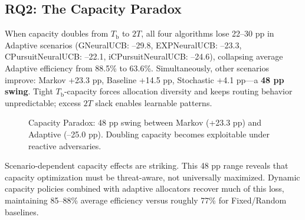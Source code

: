 \documentclass[sigconf,anonymous]{acmart}
\newcommand{\Tb}{T_{\text{b}}}
\newcommand{\TwoT}{2T}
\begin{document}
\subsection{RQ2: The Capacity Paradox}

When capacity doubles from $\Tb$ to $\TwoT$, all four algorithms lose 22--30 pp in Adaptive scenarios (GNeuralUCB: --29.8, EXPNeuralUCB: --23.3, CPursuitNeuralUCB: --22.1, iCPursuitNeuralUCB: --24.6), collapsing average Adaptive efficiency from 88.5\% to 63.6\%. Simultaneously, other scenarios improve: Markov +23.3 pp, Baseline +14.5 pp, Stochastic +4.1 pp—a \textbf{48 pp swing}. Tight $\Tb$-capacity forces allocation diversity and keeps routing behavior unpredictable; excess $\TwoT$ slack enables learnable patterns.

\begin{figure}[tb]
\centering
{}
\caption{Capacity Paradox: 48 pp swing between Markov (+23.3 pp) and Adaptive (--25.0 pp). Doubling capacity becomes exploitable under reactive adversaries.}
\label{fig:paradox}
\end{figure}

Scenario-dependent capacity effects are striking. This 48 pp range reveals that capacity optimization must be threat-aware, not universally maximized. Dynamic capacity policies combined with adaptive allocators recover much of this loss, maintaining 85--88\% average efficiency versus roughly 77\% for Fixed/Random baselines.
\end{document}
